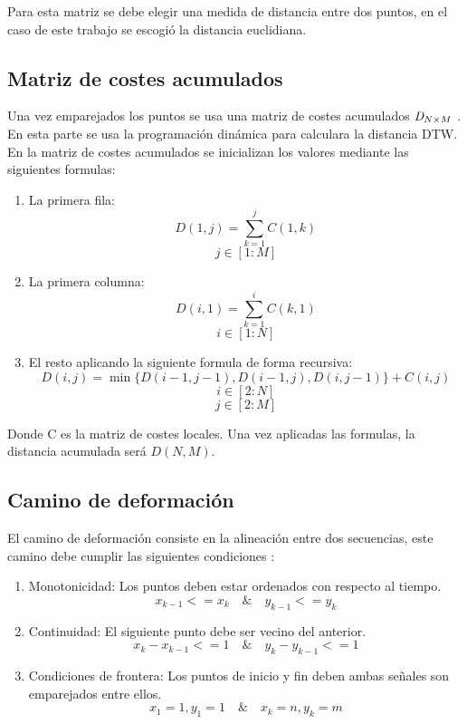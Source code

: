Para esta matriz se debe elegir una medida de distancia entre dos puntos, en el caso de este trabajo se escogió la distancia euclidiana.

\subsection{Matriz de costes acumulados}
Una vez emparejados los puntos se usa una matriz de costes acumulados $\emph{D}_{N\times M}$   \cite{dtw:formulas1, dtw:formulas2}. En esta parte se usa la programación dinámica para calculara la distancia DTW. En la matriz de costes acumulados se inicializan los valores mediante las siguientes formulas:
\begin{enumerate}
	\item  La primera fila:
	\begin{equation}
	D(1,j) = \sum_{k=1}^{j}C(1,k)
	\end{equation} 
	\[j \in [1:M]\]
	\item La primera columna:
	\begin{equation}
		D(i,1) = \sum_{k=1}^{i}C(k,1)
	\end{equation} 
	\[i \in [1:N]\]
	\item El resto aplicando la siguiente formula de forma recursiva:
	\begin{equation}
		D(i,j) = \min\{D(i-1, j-1),D(i-1,j),D(i,j-1)\} + C(i,j)
	\end{equation}
	\[i \in [2:N]\]
	\[j \in [2:M]\]
\end{enumerate}
Donde C es la matriz de costes locales. Una vez aplicadas las formulas, la distancia acumulada será $D(N, M)$.

\subsection{Camino de deformación}
El camino de deformación consiste en la alineación entre dos secuencias, este camino debe cumplir las siguientes condiciones \cite{dtw:deformación}:
\begin{enumerate}
	\item Monotonicidad: Los puntos deben estar ordenados con respecto al tiempo.
	\begin{equation}
		x_{k-1} <= x_k \quad \& \quad y_{k-1} <= y_k
	\end{equation}
	\item Continuidad: El siguiente punto debe ser vecino del anterior.
	\begin{equation}
		x_k - x_{k-1} <= 1 \quad \& \quad y_k - y_{k-1} <= 1
	\end{equation}
	\item Condiciones de frontera: Los puntos de inicio y fin deben ambas señales son emparejados entre ellos. 
	\begin{equation}
		x_1=1, y_1=1 \quad \& \quad x_k = n, y_k = m 
	\end{equation}
\end{enumerate}

